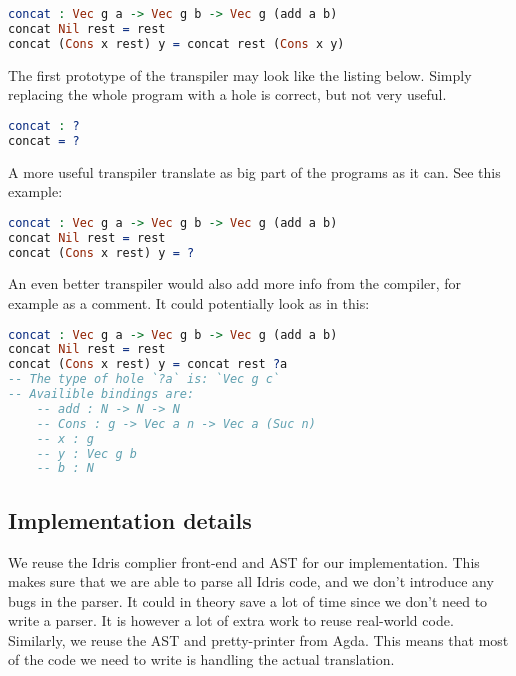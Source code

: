 \begin{lstlisting}[language=Idris,label={lst:hole1},caption={}]
concat : Vec g a -> Vec g b -> Vec g (add a b)
concat Nil rest = rest
concat (Cons x rest) y = concat rest (Cons x y)
\end{lstlisting}

The first prototype of the transpiler may look like the listing below.
Simply replacing the whole program with a hole is correct, but not very
useful.

\begin{lstlisting}[language=Idris,label={lst:hole2},caption={}]
concat : ?
concat = ?
\end{lstlisting}

A more useful transpiler translate as big part of the programs as it can. See
this example: %

\begin{lstlisting}[language=Idris,label={lst:hole3},caption={}]
concat : Vec g a -> Vec g b -> Vec g (add a b)
concat Nil rest = rest
concat (Cons x rest) y = ?
\end{lstlisting}

An even better transpiler would also add more info from the compiler, for
example as a comment. It could potentially look as in this:

\begin{lstlisting}[language=Idris,label={lst:hole4},caption={}]
concat : Vec g a -> Vec g b -> Vec g (add a b)
concat Nil rest = rest
concat (Cons x rest) y = concat rest ?a
-- The type of hole `?a` is: `Vec g c`
-- Availible bindings are:
    -- add : N -> N -> N
    -- Cons : g -> Vec a n -> Vec a (Suc n)
    -- x : g
    -- y : Vec g b
    -- b : N
\end{lstlisting}


\subsection{Implementation details}

We reuse the Idris complier front-end and AST for our implementation. This
makes sure that we are able to parse all Idris code, and we don't introduce any
bugs in the parser. It could in theory save a lot of time since we don't need
to write a parser. It is however a lot of extra work to reuse real-world code.
Similarly, we reuse the AST and pretty-printer from Agda. This means that most
of the code we need to write is handling the actual translation.


